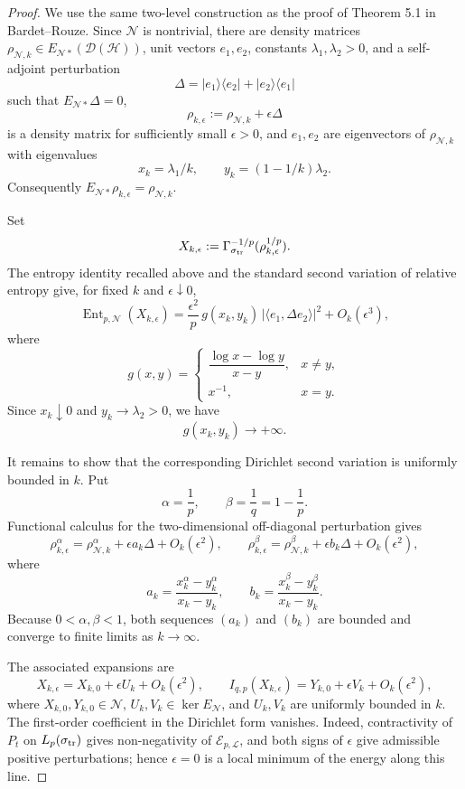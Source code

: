 \documentclass[11pt]{article}
\newcommand{\cE}{\mathcal E}
\newcommand{\cH}{\mathcal H}
\newcommand{\cL}{\mathcal L}
\newcommand{\cN}{\mathcal N}
\newcommand{\Ent}{\operatorname{Ent}}
\newcommand{\Gammaop}{\Gamma_{\sigma_{\rm tr}}}
\begin{document}
\begin{proof}
We use the same two-level construction as the proof of Theorem 5.1 in Bardet--Rouze. Since \(\cN\) is nontrivial, there are density matrices \(\rho_{\cN,k}\in E_{\cN *}(\mathcal D(\cH))\), unit vectors \(e_1,e_2\), constants \(\lambda_1,\lambda_2>0\), and a self-adjoint perturbation
\[
  \Delta=|e_1\rangle\langle e_2|+|e_2\rangle\langle e_1|
\]
such that \(E_{\cN *}\Delta=0\),
\[
  \rho_{k,\epsilon}:=\rho_{\cN,k}+\epsilon\Delta
\]
is a density matrix for sufficiently small \(\epsilon>0\), and \(e_1,e_2\) are eigenvectors of \(\rho_{\cN,k}\) with eigenvalues
\[
  x_k=\lambda_1/k,\qquad y_k=(1-1/k)\lambda_2.
\]
Consequently \(E_{\cN *}\rho_{k,\epsilon}=\rho_{\cN,k}\).

Set
\[
  X_{k,\epsilon}:=\Gammaop^{-1/p}(\rho_{k,\epsilon}^{1/p}).
\]
The entropy identity recalled above and the standard second variation of relative entropy give, for fixed \(k\) and \(\epsilon\downarrow0\),
\[
  \Ent_{p,\cN}(X_{k,\epsilon})
  =
  \frac{\epsilon^2}{p}\,
  g(x_k,y_k)\,|\langle e_1,\Delta e_2\rangle|^2
  +O_k(\epsilon^3),
\]
where
\[
  g(x,y)=
  \begin{cases}
    \dfrac{\log x-\log y}{x-y},&x\ne y,\\[0.8em]
    x^{-1},&x=y.
  \end{cases}
\]
Since \(x_k\downarrow0\) and \(y_k\to\lambda_2>0\), we have
\[
  g(x_k,y_k)\longrightarrow+\infty.
\]

It remains to show that the corresponding Dirichlet second variation is uniformly bounded in \(k\). Put
\[
  \alpha=\frac1p,\qquad \beta=\frac1q=1-\frac1p.
\]
Functional calculus for the two-dimensional off-diagonal perturbation gives
\[
  \rho_{k,\epsilon}^{\alpha}
  =
  \rho_{\cN,k}^{\alpha}
  +\epsilon a_k\Delta
  +O_k(\epsilon^2),
  \qquad
  \rho_{k,\epsilon}^{\beta}
  =
  \rho_{\cN,k}^{\beta}
  +\epsilon b_k\Delta
  +O_k(\epsilon^2),
\]
where
\[
  a_k=\frac{x_k^\alpha-y_k^\alpha}{x_k-y_k},
  \qquad
  b_k=\frac{x_k^\beta-y_k^\beta}{x_k-y_k}.
\]
Because \(0<\alpha,\beta<1\), both sequences \((a_k)\) and \((b_k)\) are bounded and converge to finite limits as \(k\to\infty\).

The associated expansions are
\[
  X_{k,\epsilon}=X_{k,0}+\epsilon U_k+O_k(\epsilon^2),
  \qquad
  I_{q,p}(X_{k,\epsilon})=Y_{k,0}+\epsilon V_k+O_k(\epsilon^2),
\]
where \(X_{k,0},Y_{k,0}\in\cN\), \(U_k,V_k\in\ker E_\cN\), and \(U_k,V_k\) are uniformly bounded in \(k\). The first-order coefficient in the Dirichlet form vanishes. Indeed, contractivity of \(P_t\) on \(L_p(\sigma_{\rm tr})\) gives non-negativity of \(\cE_{p,\cL}\), and both signs of \(\epsilon\) give admissible positive perturbations; hence \(\epsilon=0\) is a local minimum of the energy along this line.


\end{proof}
\end{document}
